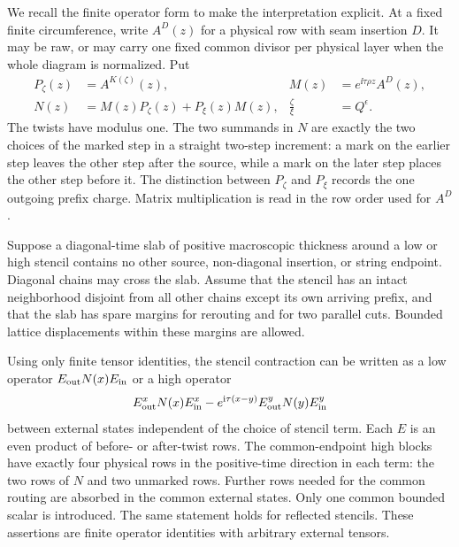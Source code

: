 We recall the finite operator form to make the interpretation explicit.
At a fixed finite circumference, write $A^D(z)$ for a physical row with
seam insertion $D$.  It may be raw, or may carry one fixed common
divisor per physical layer when the whole diagram is normalized.  Put
\begin{equation}
 \begin{aligned}
 P_\zeta(z)&=A^{K(\zeta)}(z),&
 M(z)&=e^{\ii\tau\rho z}A^D(z),\\
 N(z)&=M(z)P_\zeta(z)+P_\xi(z)M(z),&
 \frac{\zeta}{\xi}&=Q^\epsilon .
 \end{aligned}
 \label{calc:row-current}
\end{equation}
The twists have modulus one.  The two summands in $N$ are exactly
the two choices of the marked step in a straight two-step increment:
a mark on the earlier step leaves the other step after the source,
while a mark on the later step places the other step before it.
The distinction between $P_\zeta$ and $P_\xi$ records the one
outgoing prefix charge.  Matrix multiplication is read in the row
order used for $A^D$.

\begin{proposition}
\label{prop:finite-extraction}
Suppose a diagonal-time slab of positive macroscopic thickness
around a low or high stencil contains no other source, non-diagonal
insertion, or string endpoint.  Diagonal chains may cross the slab.
Assume that the stencil has an intact neighborhood disjoint from
all other chains except its own arriving prefix, and that the slab
has spare margins for rerouting and for two parallel cuts.
Bounded lattice displacements within these margins are allowed.

Using only finite tensor identities, the stencil contraction can be
written as a low operator
$E_{\rm out}N(x)E_{\rm in}$ or a high operator
\begin{equation}
 E_{\rm out}^xN(x)E_{\rm in}^x
 -e^{\mathrm i\tau(x-y)}E_{\rm out}^yN(y)E_{\rm in}^y
 \label{calc:finite-high-operator}
\end{equation}
between external states independent of the choice of stencil term.
Each $E$ is an even product of before- or after-twist rows.  The
common-endpoint high blocks have exactly four physical rows in the
positive-time direction in each term: the two rows of $N$ and two
unmarked rows. Further rows
needed for the common routing are absorbed in the common external
states.  Only one common bounded scalar is introduced.  The same
statement holds for reflected stencils.  These assertions are finite
operator identities with arbitrary external tensors.
\end{proposition}

